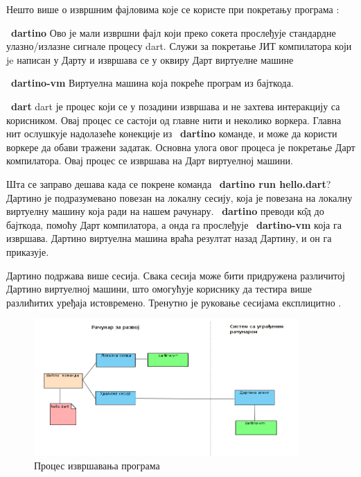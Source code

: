 \documentclass[12pt,oneside]{memoir}
\begin{document}
Нешто више о извршним фајловима које се користе при покретању програма \cite{komande}:
\begin{description}
\item ~\textbf{dartino}
Ово је мали извршни фајл који преко сокета прослеђује стандардне улазно/излазне сигнале процесу dart. Служи за покретање ЈИТ компилатора који je написан у Дарту и извршава се у оквиру Дарт виртуелне машине
\item ~\textbf{dartino-vm} 
Виртуелна машина која покреће програм из бајткода.
\item ~\textbf{dart}
dart је процес који се у позадини извршава и не захтева интеракцију са корисником. Овај процес се састоји од главне нити и неколико воркера. Главна нит ослушкује надолазеће конекције из ~\textbf{dartino} команде, и може да користи воркере да обави тражени задатак. Основна улога овог процеса је покретање Дарт компилатора. Овај процес се извршава на Дарт виртуелној машини.
\end{description}

Шта се заправо дешава када се покрене команда ~\textbf{dartino run hello.dart}? Дартино је подразумевано повезан на локалну сесију, која је повезана на локалну виртуелну машину која ради на нашем рачунару. ~\textbf{dartino} преводи к\^{о}д до бајткода, помоћу Дарт компилатора, а онда га прослеђује ~\textbf{dartino-vm} која га извршава. Дартино виртуелна машина враћа резултат назад Дартину, и он га приказује.

Дартино подржава више сесија. Свака сесија може бити придружена различитој Дартино виртуелној машини, што омогућује кориснику да тестира више разлићитих уређаја истовремено. Тренутно је руковање сесијама експлицитно \cite{Dartino, komande}.

\begin{figure}[!ht]
  \centering
  \includegraphics[width=0.9\textwidth]{sesije.png}
  \caption{Процес извршавања програма}
  \label{fig:izvrsavanje}
\end{figure}
\end{document}
